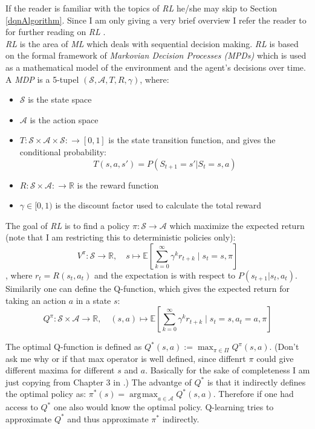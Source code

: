 \documentclass{article}
\newcommand{\RL}{\emph{RL} }
\newcommand{\ML}{\emph{ML} }
\DeclareMathOperator*{\argmax}{arg\!max}
\begin{document}
If the reader is familiar with the topics of \RL he/she may skip to Section \ref{dqnAlgorithm}. Since I am only giving a very brief overview I refer the reader to \cite{introRL} for further reading on \RL. \\ 
\RL is the area of \ML which deals with sequential decision making. \RL is based on the formal framework of \emph{Markovian Decision Processes (MPDs)} which is used as a mathematical model of the environment and the agent's decisions over time. A \emph{MDP} is a 5-tupel  $(\mathcal{S}, \mathcal{A}, T, R, \gamma)$, where: 
\begin{itemize}
	\item $\mathcal{S}$ is the state space
	\item $\mathcal{A}$ is the action space
	\item $T: \mathcal{S} \times \mathcal{A} \times \mathcal{S}: \rightarrow [0, 1]$ is the state transition function, and gives the conditional probability: $${T(s,a,s') = P(S_{t+1}=s' | S_t=s, a)}$$
	\item $R: \mathcal{S} \times \mathcal{A}: \rightarrow \mathbb{R}$ is the reward function
	\item $\gamma \in [0,1)$ is the discount factor used to calculate the total reward
\end{itemize}

The goal of \RL is to find a policy $\pi: \mathcal{S} \rightarrow \mathcal{A}$ which maximize the expected return (note that I am restricting this to deterministic policies only):
\begin{equation}
	V^{\pi}: \mathcal{S} \rightarrow \mathbb{R}, \quad s \mapsto \mathbb{E}\left[ \sum_{k=0}^{\infty} \gamma^k r_{t+k}    \mid  s_t=s, \pi \right ] 
\end{equation}
, where $r_t = R(s_t, a_t)$ and the expectation is with respect to $P(s_{t+1} | s_t, a_t)$. Similarily one can define the Q-function, which gives the expected return for taking an action $a$ in a state $s$:
\begin{equation}
	Q^{\pi}: \mathcal{S} \times \mathcal{A} \rightarrow \mathbb{R}, \quad (s,a) \mapsto \mathbb{E}\left[ \sum_{k=0}^{\infty} \gamma^k r_{t+k}    \mid  s_t=s, a_t = a, \pi \right ]
\end{equation}

The optimal Q-function is defined as $Q^*(s,a) := \max_{\pi \in \Pi} Q^{\pi}(s,a)$. (Don't ask me why or if that max operator is well defined, since diffenrt $\pi$ could give different maxima for different $s$ and $a$. Basically for the sake of completeness I am just copying from Chapter 3 in \cite{introRL}.) The advantge of $Q^*$ is that it indirectly defines the optimal policy as: $\pi^*(s) = \argmax_{a \in \mathcal{A}}Q^*(s,a)$. Therefore if one had access to $Q^*$ one also would know the optimal policy. Q-learning tries to approximate $Q^*$ and thus approximate $\pi^*$ indirectly.
\end{document}
